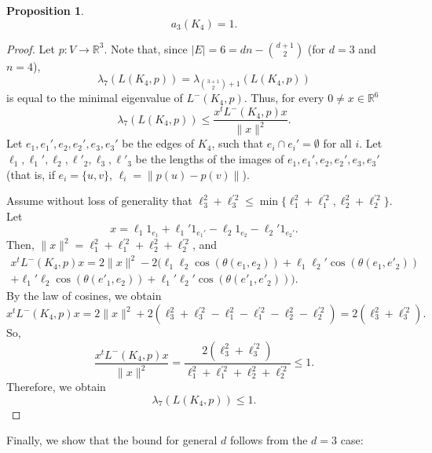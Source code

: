 \documentclass[a4paper,11pt]{article}
\theoremstyle{plain}
\newtheorem{proposition}[theorem]{\bf Proposition}
\theoremstyle{definition}
\newcommand{\Rea}{{\mathbb R}}
\begin{document}
\begin{proposition}
\[
    a_3(K_4)= 1.
\]
\end{proposition}
\begin{proof}
Let $p:V\to \Rea^3$. Note that, since $|E|=6=dn-\binom{d+1}{2}$ (for $d=3$ and $n=4$), 
\[
    \lambda_7(L(K_4,p))=\lambda_{\binom{3+1}{2}+1}(L(K_4,p))
\]
is equal to the minimal eigenvalue of $L^{-}(K_4,p)$.
Thus, for every $0\neq x\in \Rea^6$
\[
 \lambda_7(L(K_4,p)) \leq \frac{x^t L^{-}(K_4,p) x}{\|x\|^2}.
\]
Let $e_{1},e_1',e_2,e_2',e_3,e_3'$ be the edges of $K_4$, such that $e_i\cap e_i'=\emptyset$ for all $i$.
Let $\ell_1,\ell_1',\ell_2,\ell'_2,\ell_3,\ell'_3$ be the lengths of the images of $e_{1},e_1',e_2,e_2',e_3,e_3'$ (that is, if $e_i=\{u,v\}$, $\ell_i=\|p(u)-p(v)\|$).

Assume without loss of generality that $\ell_3^2+\ell_3^{'2} \leq \min\{\ell_1^2+\ell_1^{'2} ,\ell_2^2+\ell_2^{'2}\}$. Let
\[
    x= \ell_1 1_{e_1}+\ell_1' 1_{e_1'}-\ell_2 1_{e_2}-\ell_2' 1_{e_2'}.
\]
Then, $\|x\|^2=\ell_1^2+\ell_1^{'2}+\ell_2^2+\ell_2^{'2}$, and
\begin{multline*}
    x^t L^{-}(K_4,p) x
    =2\|x\|^2 - 2(\ell_1\ell_2\cos(\theta(e_1,e_2))+\ell_1\ell_2'\cos(\theta(e_1,e'_2))\\+\ell_1'\ell_2\cos(\theta(e'_1,e_2)) 
    +\ell_1'\ell_2'\cos(\theta(e'_1,e'_2))).
\end{multline*}
By the law of cosines, we obtain
\[
    x^t L^{-}(K_4,p) x
    =2\|x\|^2 +2(\ell_3^2+\ell_3^{'2}- \ell_1^2-\ell_1^{'2}-\ell_2^2-\ell_2^{'2}) = 2(\ell_3^2+\ell_3^{'2}).
\]
So,
\[
\frac{x^t L^{-}(K_4,p) x}{\|x\|^2}= \frac{2(\ell_3^2+\ell_3^{'2})}{\ell_1^2+\ell_1^{'2}+\ell_2^2+\ell_2^{'2}}\leq 1.
\]
Therefore, we obtain
\[
 \lambda_7(L(K_4,p)) \leq 1.
\]
\end{proof}

Finally, we show that the bound for general $d$ follows from the $d=3$ case:
\end{document}
